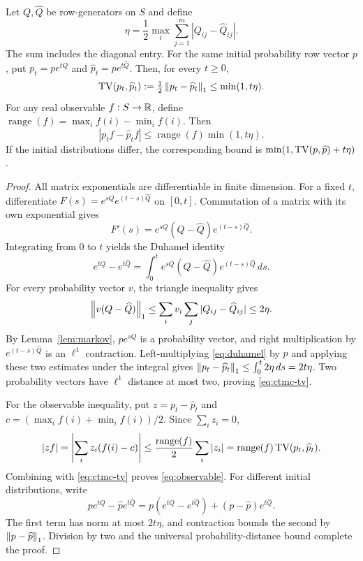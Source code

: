 \begin{theorem}
\label{thm:ctmc}
Let $Q,\widehat Q$ be row-generators on $S$ and define
\begin{equation}
 \eta=\frac12\max_i\sum_{j=1}^m|Q_{ij}-\widehat Q_{ij}|.
 \label{eq:eta}
\end{equation}
The sum includes the diagonal entry. For the same initial probability
row vector $p$, put $p_t=pe^{tQ}$ and
$\widehat p_t=pe^{t\widehat Q}$. Then, for every $t\ge0$,
\begin{equation}
 \operatorname{TV}(p_t,\widehat p_t):=\tfrac12\left\lVert p_t-\widehat p_t\right\rVert_1
 \le\min(1,t\eta).
 \label{eq:ctmc-tv}
\end{equation}
For any real observable $f:S\to\mathbb{R}$, define
$\operatorname{range}(f)=\max_i f(i)-\min_i f(i)$. Then
\begin{equation}
 |p_t f-\widehat p_t f|
 \le\operatorname{range}(f)\min(1,t\eta).
 \label{eq:observable}
\end{equation}
If the initial distributions differ, the corresponding bound is
$\min(1,\operatorname{TV}(p,\widehat p)+t\eta)$.
\end{theorem}
\begin{proof}
All matrix exponentials are differentiable in finite dimension. For a fixed
$t$, differentiate $F(s)=e^{sQ}e^{(t-s)\widehat Q}$ on $[0,t]$.
Commutation of a matrix with its own exponential gives
\[
 F'(s)=e^{sQ}(Q-\widehat Q)e^{(t-s)\widehat Q}.
\]
Integrating from $0$ to $t$ yields the Duhamel identity
\begin{equation}
 e^{tQ}-e^{t\widehat Q}
 =\int_0^t e^{sQ}(Q-\widehat Q)e^{(t-s)\widehat Q}\,ds.
 \label{eq:duhamel}
\end{equation}
For every probability vector $v$, the triangle inequality gives
\[
 \left\lVert v(Q-\widehat Q)\right\rVert_1
 \le\sum_i v_i\sum_j|Q_{ij}-\widehat Q_{ij}|\le2\eta.
\]
By Lemma~\ref{lem:markov}, $pe^{sQ}$ is a probability vector, and
right multiplication by $e^{(t-s)\widehat Q}$ is an $\ell^1$
contraction. Left-multiplying \eqref{eq:duhamel} by $p$ and applying
these two estimates under the integral gives
$\left\lVert p_t-\widehat p_t\right\rVert_1\le\int_0^t2\eta\,ds=2t\eta$.
Two probability vectors have $\ell^1$ distance at most two, proving
\eqref{eq:ctmc-tv}.

For the observable inequality, put $z=p_t-\widehat p_t$ and
$c=(\max_i f(i)+\min_i f(i))/2$. Since $\sum_i z_i=0$,
\[
 |zf|=\left|\sum_i z_i(f(i)-c)\right|
 \le\frac{\operatorname{range}(f)}2\sum_i|z_i|
 =\operatorname{range}(f)\operatorname{TV}(p_t,\widehat p_t).
\]
Combining with \eqref{eq:ctmc-tv} proves \eqref{eq:observable}.
For different initial distributions, write
\[
 pe^{tQ}-\widehat p e^{t\widehat Q}
 =p(e^{tQ}-e^{t\widehat Q})
   +(p-\widehat p)e^{t\widehat Q}.
\]
The first term has norm at most $2t\eta$, and contraction bounds the
second by $\left\lVert p-\widehat p\right\rVert_1$. Division by two and the universal
probability-distance bound complete the proof.
\end{proof}

